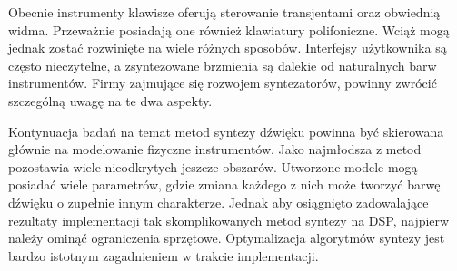 Obecnie instrumenty klawisze oferują sterowanie transjentami oraz obwiednią widma. Przeważnie posiadają one również klawiatury polifoniczne. Wciąż mogą jednak zostać rozwinięte na wiele różnych sposobów. Interfejsy użytkownika są często nieczytelne, a zsyntezowane brzmienia są dalekie od naturalnych barw instrumentów. Firmy zajmujące się rozwojem syntezatorów, powinny zwrócić szczególną uwagę na te dwa aspekty.

Kontynuacja badań na temat metod syntezy dźwięku powinna być skierowana głównie na modelowanie fizyczne instrumentów. Jako najmłodsza z metod pozostawia wiele nieodkrytych jeszcze obszarów. Utworzone modele mogą posiadać wiele parametrów, gdzie zmiana każdego z nich może tworzyć barwę dźwięku o zupełnie innym charakterze. Jednak aby osiągnięto zadowalające rezultaty implementacji tak skomplikowanych metod syntezy na DSP, najpierw należy ominąć ograniczenia sprzętowe. Optymalizacja algorytmów syntezy jest bardzo istotnym zagadnieniem w trakcie implementacji.
